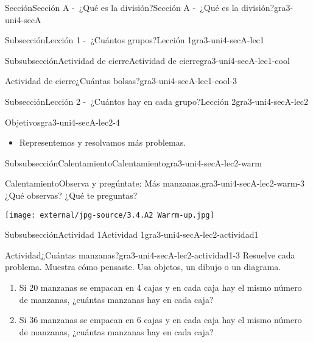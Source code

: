 \documentclass[twoside,10pt,]{article}
\begin{document}
\begin{sectionptx}{Sección}{Sección A -~¿Qué es la división?}{}{Sección A -~¿Qué es la división?}{}{}{gra3-uni4-secA}
\begin{subsectionptx}{Subsección}{Lección 1 -~¿Cuántos grupos?}{}{Lección 1}{}{}{gra3-uni4-secA-lec1}
\begin{subsubsectionptx}{Subsubsección}{Actividad de cierre}{}{Actividad de cierre}{}{}{gra3-uni4-secA-lec1-cool}
\begin{project}{Actividad de cierre}{¿Cuántas bolsas?}{gra3-uni4-secA-lec1-cool-3}
\end{project}%
\end{subsubsectionptx}
\end{subsectionptx}
%
%
\typeout{************************************************}
\typeout{************************************************}
%
\begin{subsectionptx}{Subsección}{Lección 2 -~¿Cuántos hay en cada grupo?}{}{Lección 2}{}{}{gra3-uni4-secA-lec2}
\begin{objectives}{Objetivos}{gra3-uni4-secA-lec2-4}
%
\begin{itemize}[label=\textbullet]
\item{}Representemos y resolvamos más problemas.%
\end{itemize}
\end{objectives}
%
%
\typeout{************************************************}
\typeout{************************************************}
%
\begin{subsubsectionptx}{Subsubsección}{Calentamiento}{}{Calentamiento}{}{}{gra3-uni4-secA-lec2-warm}
\begin{exploration}{Calentamiento}{Observa y pregúntate: Más manzanas.}{gra3-uni4-secA-lec2-warm-3}%
¿Qué observas? ¿Qué te preguntas?%
\begin{image}{0}{1}{0}{}%
\texttt{[image: external/jpg-source/3.4.A2 Warrm-up.jpg]}
\end{image}%
\end{exploration}%
\end{subsubsectionptx}
%
%
\typeout{************************************************}
\typeout{************************************************}
%
\begin{subsubsectionptx}{Subsubsección}{Actividad 1}{}{Actividad 1}{}{}{gra3-uni4-secA-lec2-actividad1}
\begin{activity}{Actividad}{¿Cuántas manzanas?}{gra3-uni4-secA-lec2-actividad1-3}%
Resuelve cada problema. Muestra cómo pensaste. Usa objetos, un dibujo o un diagrama.%
\par
%
\begin{enumerate}
\item{}Si 20 manzanas se empacan en 4 cajas y en cada caja hay el mismo número de manzanas, ¿cuántas manzanas hay en cada caja?%
\item{}Si 36 manzanas se empacan en 6 cajas y en cada caja hay el mismo número de manzanas, ¿cuántas manzanas hay en cada caja?%

\end{enumerate}
\end{activity}
\end{subsubsectionptx}
\end{subsectionptx}
\end{sectionptx}
\end{document}
